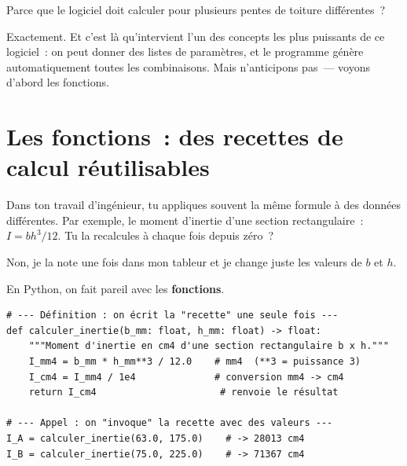\documentclass[12pt, a4paper, openany]{book}
\begin{document}
\begin{apprenti}
Parce que le logiciel doit calculer pour plusieurs pentes de toiture
diff\'erentes~?
\end{apprenti}

\begin{maitre}
Exactement. Et c'est l\`a qu'intervient l'un des concepts les plus puissants
de ce logiciel~: on peut donner des listes de param\`etres, et le programme
g\'en\`ere automatiquement toutes les combinaisons. Mais n'anticipons pas~---
voyons d'abord les fonctions.
\end{maitre}

\section{Les fonctions~: des recettes de calcul r\'eutilisables}

\begin{maitre}
Dans ton travail d'ing\'enieur, tu appliques souvent la m\^eme formule
\`a des donn\'ees diff\'erentes. Par exemple, le moment d'inertie d'une
section rectangulaire~:
$I = bh^3/12$.
Tu la recalcules \`a chaque fois depuis z\'ero~?
\end{maitre}

\begin{apprenti}
Non, je la note une fois dans mon tableur et je change juste les valeurs
de $b$ et $h$.
\end{apprenti}

\begin{maitre}
En Python, on fait pareil avec les \textbf{fonctions}.
\end{maitre}

\begin{lstlisting}[style=python, caption={Définition et appel d'une fonction Python}]
# --- Définition : on écrit la "recette" une seule fois ---
def calculer_inertie(b_mm: float, h_mm: float) -> float:
    """Moment d'inertie en cm4 d'une section rectangulaire b x h."""
    I_mm4 = b_mm * h_mm**3 / 12.0    # mm4  (**3 = puissance 3)
    I_cm4 = I_mm4 / 1e4              # conversion mm4 -> cm4
    return I_cm4                      # renvoie le résultat

# --- Appel : on "invoque" la recette avec des valeurs ---
I_A = calculer_inertie(63.0, 175.0)    # -> 28013 cm4
I_B = calculer_inertie(75.0, 225.0)    # -> 71367 cm4
\end{lstlisting}
\end{document}
